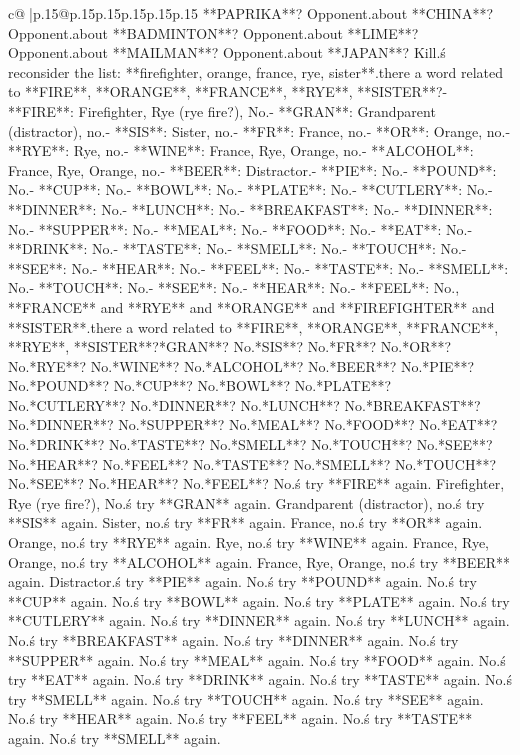 \documentclass{article}
\begin{document}
{\begin{supertabular}{c@{$\;$}|p{.15\linewidth}@{}p{.15\linewidth}p{.15\linewidth}p{.15\linewidth}p{.15\linewidth}p{.15\linewidth}}
{{{**PAPRIKA**? Opponent.\nHow about **CHINA**? Opponent.\nHow about **BADMINTON**? Opponent.\nHow about **LIME**? Opponent.\nHow about **MAILMAN**? Opponent.\nHow about **JAPAN**? Kill.\n\nLet\'s reconsider the list: **firefighter, orange, france, rye, sister**.\nIs there a word related to **FIRE**, **ORANGE**, **FRANCE**, **RYE**, **SISTER**?\n- **FIRE**: Firefighter, Rye (rye fire?), No.\n- **GRAN**: Grandparent (distractor), no.\n- **SIS**: Sister, no.\n- **FR**: France, no.\n- **OR**: Orange, no.\n- **RYE**: Rye, no.\n- **WINE**: France, Rye, Orange, no.\n- **ALCOHOL**: France, Rye, Orange, no.\n- **BEER**: Distractor.\n- **PIE**: No.\n- **POUND**: No.\n- **CUP**: No.\n- **BOWL**: No.\n- **PLATE**: No.\n- **CUTLERY**: No.\n- **DINNER**: No.\n- **LUNCH**: No.\n- **BREAKFAST**: No.\n- **DINNER**: No.\n- **SUPPER**: No.\n- **MEAL**: No.\n- **FOOD**: No.\n- **EAT**: No.\n- **DRINK**: No.\n- **TASTE**: No.\n- **SMELL**: No.\n- **TOUCH**: No.\n- **SEE**: No.\n- **HEAR**: No.\n- **FEEL**: No.\n- **TASTE**: No.\n- **SMELL**: No.\n- **TOUCH**: No.\n- **SEE**: No.\n- **HEAR**: No.\n- **FEEL**: No.\n\nWait, **FRANCE** and **RYE** and **ORANGE** and **FIREFIGHTER** and **SISTER**.\nIs there a word related to **FIRE**, **ORANGE**, **FRANCE**, **RYE**, **SISTER**?\nMaybe **GRAN**? No.\nMaybe **SIS**? No.\nMaybe **FR**? No.\nMaybe **OR**? No.\nMaybe **RYE**? No.\nMaybe **WINE**? No.\nMaybe **ALCOHOL**? No.\nMaybe **BEER**? No.\nMaybe **PIE**? No.\nMaybe **POUND**? No.\nMaybe **CUP**? No.\nMaybe **BOWL**? No.\nMaybe **PLATE**? No.\nMaybe **CUTLERY**? No.\nMaybe **DINNER**? No.\nMaybe **LUNCH**? No.\nMaybe **BREAKFAST**? No.\nMaybe **DINNER**? No.\nMaybe **SUPPER**? No.\nMaybe **MEAL**? No.\nMaybe **FOOD**? No.\nMaybe **EAT**? No.\nMaybe **DRINK**? No.\nMaybe **TASTE**? No.\nMaybe **SMELL**? No.\nMaybe **TOUCH**? No.\nMaybe **SEE**? No.\nMaybe **HEAR**? No.\nMaybe **FEEL**? No.\nMaybe **TASTE**? No.\nMaybe **SMELL**? No.\nMaybe **TOUCH**? No.\nMaybe **SEE**? No.\nMaybe **HEAR**? No.\nMaybe **FEEL**? No.\n\nLet\'s try **FIRE** again. Firefighter, Rye (rye fire?), No.\nLet\'s try **GRAN** again. Grandparent (distractor), no.\nLet\'s try **SIS** again. Sister, no.\nLet\'s try **FR** again. France, no.\nLet\'s try **OR** again. Orange, no.\nLet\'s try **RYE** again. Rye, no.\nLet\'s try **WINE** again. France, Rye, Orange, no.\nLet\'s try **ALCOHOL** again. France, Rye, Orange, no.\nLet\'s try **BEER** again. Distractor.\nLet\'s try **PIE** again. No.\nLet\'s try **POUND** again. No.\nLet\'s try **CUP** again. No.\nLet\'s try **BOWL** again. No.\nLet\'s try **PLATE** again. No.\nLet\'s try **CUTLERY** again. No.\nLet\'s try **DINNER** again. No.\nLet\'s try **LUNCH** again. No.\nLet\'s try **BREAKFAST** again. No.\nLet\'s try **DINNER** again. No.\nLet\'s try **SUPPER** again. No.\nLet\'s try **MEAL** again. No.\nLet\'s try **FOOD** again. No.\nLet\'s try **EAT** again. No.\nLet\'s try **DRINK** again. No.\nLet\'s try **TASTE** again. No.\nLet\'s try **SMELL** again. No.\nLet\'s try **TOUCH** again. No.\nLet\'s try **SEE** again. No.\nLet\'s try **HEAR** again. No.\nLet\'s try **FEEL** again. No.\nLet\'s try **TASTE** again. No.\nLet\'s try **SMELL** again. }}}
\end{supertabular}}
\end{document}
